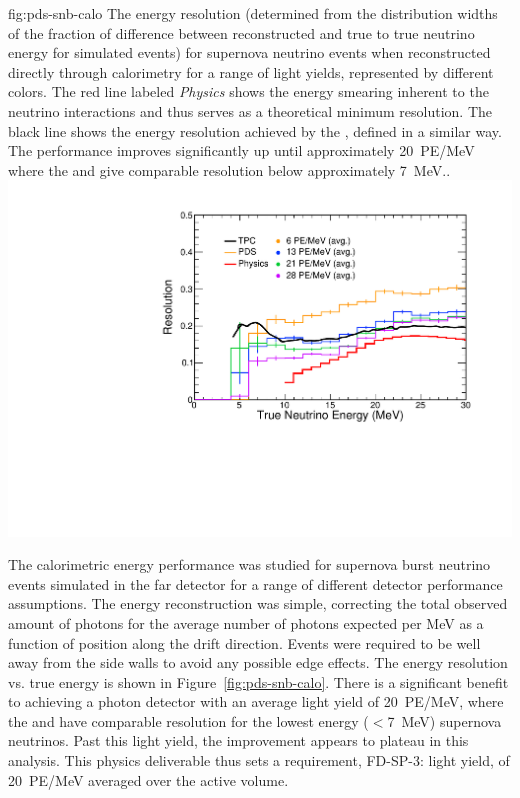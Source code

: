 \begin{dunefigure}
{fig:pds-snb-calo}
{The energy resolution (determined from the distribution widths of the fraction of difference between reconstructed and true to true neutrino energy for simulated events) for supernova neutrino events when reconstructed directly through  calorimetry for a range of light yields, represented by different colors. The red line labeled \textit{Physics} 
shows the energy smearing inherent to the neutrino interactions and thus serves as a theoretical minimum resolution. The black line shows the energy resolution achieved by the , defined in a similar way. The performance improves significantly up until approximately \SI{20}{PE/MeV} where the  and  give comparable resolution below approximately \SI{7}{MeV}.. 
}
  \includegraphics[width=0.6\columnwidth]{graphics/pds-snb-res-vs-true.pdf}
 \end{dunefigure}

The calorimetric energy performance was studied for supernova burst neutrino events simulated in the far detector for a range of different detector performance assumptions. The energy reconstruction was simple, correcting the total observed amount of photons for the average number of photons expected per MeV as a function of position along the drift direction. Events were required to be well away from the side walls to avoid any possible edge effects. The energy resolution vs. true energy is shown in Figure~\ref{fig:pds-snb-calo}. There is a significant benefit to achieving a photon detector with an average light yield of \SI{20}{PE/MeV}, where the  and  have comparable resolution for the lowest energy ($<$\SI{7}{MeV}) supernova neutrinos. Past this light yield, the improvement appears to plateau in this analysis. This physics deliverable thus sets a requirement, FD-SP-3: light yield, of \SI{20}{PE/MeV} averaged over the active volume.

